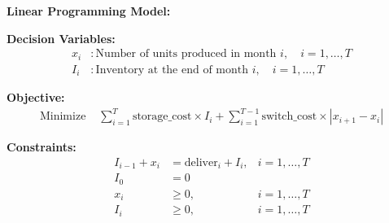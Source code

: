\documentclass{article}
\begin{document}
\textbf{Linear Programming Model:}

\textbf{Decision Variables:}
\begin{align*}
x_i &: \text{Number of units produced in month } i, \quad i = 1, \ldots, T \\
I_i &: \text{Inventory at the end of month } i, \quad i = 1, \ldots, T
\end{align*}

\textbf{Objective:}
\begin{align*}
\text{Minimize } & \sum_{i=1}^{T} \text{storage\_cost} \times I_i + \sum_{i=1}^{T-1} \text{switch\_cost} \times |x_{i+1} - x_i|
\end{align*}

\textbf{Constraints:}
\begin{align*}
I_{i-1} + x_i &= \text{deliver}_i + I_i, & i = 1, \ldots, T \\
I_0 &= 0 & \\
x_i &\geq 0, & i = 1, \ldots, T \\
I_i &\geq 0, & i = 1, \ldots, T
\end{align*}
\end{document}

